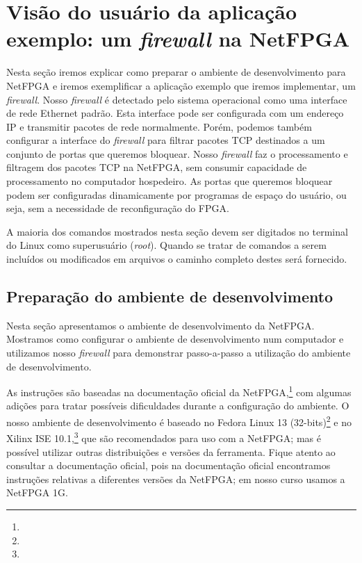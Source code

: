 \newpage
\section{Visão do usuário da aplicação exemplo: um \emph{firewall} na NetFPGA}
\label{sec:example}

Nesta seção iremos explicar como preparar o ambiente de desenvolvimento
para NetFPGA e iremos exemplificar a aplicação exemplo que iremos
implementar, um \emph{firewall}.  Nosso \emph{firewall} é detectado pelo
sistema operacional como uma interface de rede Ethernet padrão.  Esta
interface pode ser configurada com um endereço IP e transmitir pacotes
de rede normalmente.  Porém, podemos também configurar a interface do
\emph{firewall} para filtrar pacotes TCP destinados a um conjunto de
portas que queremos bloquear.  Nosso \emph{firewall} faz o processamento
e filtragem dos pacotes TCP na NetFPGA, sem consumir capacidade de
processamento no computador hospedeiro.  As portas que queremos bloquear
podem ser configuradas dinamicamente por programas de espaço do usuário,
ou seja, sem a necessidade de reconfiguração do FPGA.

A maioria dos comandos mostrados nesta seção devem ser digitados no
terminal do Linux como superusuário (\emph{root}).  Quando se tratar de
comandos a serem incluídos ou modificados em arquivos o caminho completo
destes será fornecido.

\subsection{Preparação do ambiente de desenvolvimento}

Nesta seção apresentamos o ambiente de desenvolvimento da NetFPGA.
Mostramos como configurar o ambiente de desenvolvimento num computador e
utilizamos nosso \emph{firewall} para demonstrar passo-a-passo a
utilização do ambiente de desenvolvimento.

As instruções são baseadas na documentação oficial da
NetFPGA,\footnote{}
com algumas adições para tratar possíveis dificuldades durante a
configuração do ambiente.  O nosso ambiente de desenvolvimento é baseado
no Fedora Linux 13
(32-bits)\footnote{}
e no Xilinx ISE
10.1,\footnote{}
que são recomendados para uso com a NetFPGA; mas é possível utilizar
outras distribuições e versões da ferramenta.  Fique atento ao consultar
a documentação oficial, pois na documentação oficial encontramos
instruções relativas a diferentes versões da NetFPGA; em nosso curso
usamos a NetFPGA 1G.

